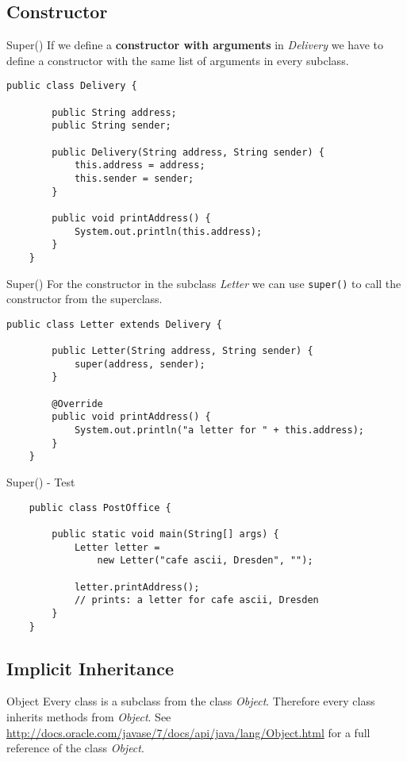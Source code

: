 \subsection{Constructor}
\begin{frame}[fragile]{Super()}
	If we define a \textbf{constructor with arguments} in \emph{Delivery} we have to define a constructor
	with the same list of arguments in every subclass.
	\begin{lstlisting}[basicstyle=\ttfamily\scriptsize]
	public class Delivery {
	
	    public String address;
	    public String sender;
	    
	    public Delivery(String address, String sender) {
	        this.address = address;
	        this.sender = sender;
	    }
	    	    
	    public void printAddress() {
	        System.out.println(this.address);
	    }
	}
	\end{lstlisting}
\end{frame}

\begin{frame}[fragile]{Super()}
	For the constructor in the subclass \emph{Letter} we can use \texttt{super()} to call the constructor
	from the superclass.
	\begin{lstlisting}[escapechar=!]
	public class Letter extends Delivery {

	    public Letter(String address, String sender) {
	        super(address, sender);
	    }
	
	    @Override
	    public void printAddress() {
	        System.out.println("a letter for " + this.address);    
	    }	
	}
	\end{lstlisting}
\end{frame}

\begin{frame}[fragile]{Super() - Test}
	\begin{lstlisting}
	public class PostOffice {
	    
	    public static void main(String[] args) {	    
	        Letter letter = 
	            new Letter("cafe ascii, Dresden", "");
	        
	        letter.printAddress();
	        // prints: a letter for cafe ascii, Dresden
	    }
	}
	\end{lstlisting}
\end{frame}

\subsection{Implicit Inheritance}
\begin{frame}{Object}
	Every class is a subclass from the class \emph{Object}. 
	Therefore every class inherits methods from \emph{Object}.
	\vfill
	See \scriptsize\url{http://docs.oracle.com/javase/7/docs/api/java/lang/Object.html} \normalsize for
	a full reference of the class \emph{Object}.
\end{frame}

